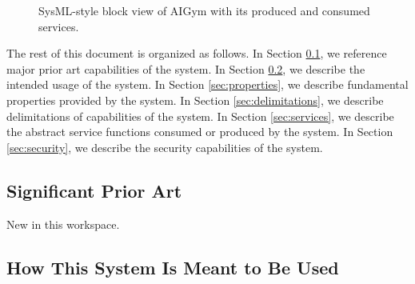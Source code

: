 \documentclass[a4paper]{arrowhead}
\begin{document}
\begin{figure}[ht!]
  \centering
  \caption{SysML-style block view of AIGym with its produced and consumed services.}
  \label{fig:system}
\end{figure}

The rest of this document is organized as follows.
In Section \ref{sec:prior_art}, we reference major prior art capabilities of the system.
In Section \ref{sec:use}, we describe the intended usage of the system.
In Section \ref{sec:properties}, we describe fundamental properties provided by the system.
In Section \ref{sec:delimitations}, we describe delimitations of capabilities of the system.
In Section \ref{sec:services}, we describe the abstract service functions consumed or produced by the system.
In Section \ref{sec:security}, we describe the security capabilities of the system.

\newpage

\subsection{Significant Prior Art}
\label{sec:prior_art}

New in this workspace.

\subsection{How This System Is Meant to Be Used}
\label{sec:use}
\end{document}
